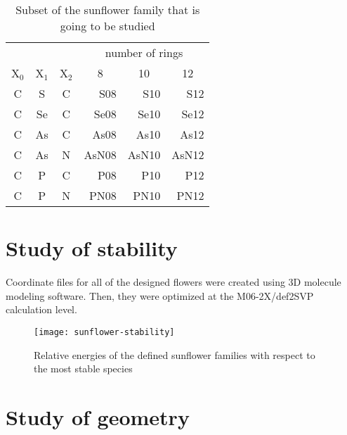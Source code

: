 \begin{table}
    \centering
    \caption[Sunflowers in this study]{Subset of the sunflower family that is going to be studied}
    \begin{tabular}{@{}cccrrr@{}}
        \toprule
        &&& \multicolumn{3}{c}{number of rings} \\
        X$_0$ & X$_1$ & X$_2$ & \multicolumn{1}{c}{8} & \multicolumn{1}{c}{10} & \multicolumn{1}{c}{12} \\
        \midrule
        C & S & C & S08 & S10 & S12 \\
        C & Se & C & Se08 & Se10 & Se12 \\
        C & As & C & As08 & As10 & As12 \\
        C & As & N & AsN08 & AsN10 & AsN12 \\
        C & P & C & P08 & P10 & P12 \\
        C & P & N & PN08 & PN10 & PN12 \\
        \bottomrule
    \end{tabular}
\end{table}

\section{Study of stability}

Coordinate files for all of the designed flowers were created using 3D molecule modeling software.
Then, they were optimized at the M06-2X/def2SVP calculation level.

\blindtext

\begin{figure}
    \centering
    \texttt{[image: sunflower-stability]}
    \caption[Stability of sunflower families]{Relative energies of the defined sunflower families with respect to the most stable species}
\end{figure}


\section{Study of geometry}



